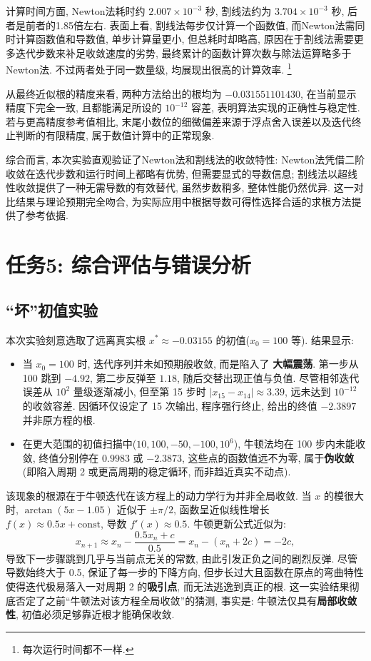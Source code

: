 \documentclass[zihao=-4,a4paper]{ctexart}
\begin{document}
计算时间方面, Newton法耗时约 $2.007\times10^{-3}$ 秒, 割线法约为 $3.704\times10^{-3}$ 秒, 后者是前者的1.85倍左右. 表面上看, 割线法每步仅计算一个函数值, 而Newton法需同时计算函数值和导数值, 单步计算量更小, 但总耗时却略高, 原因在于割线法需要更多迭代步数来补足收敛速度的劣势, 最终累计的函数计算次数与除法运算略多于Newton法. 不过两者处于同一数量级, 均展现出很高的计算效率. \footnote{每次运行时间都不一样.}

从最终近似根的精度来看, 两种方法给出的根均为 $-0.031551101430$, 在当前显示精度下完全一致, 且都能满足所设的 $10^{-12}$ 容差, 表明算法实现的正确性与稳定性. 若与更高精度参考值相比, 末尾小数位的细微偏差来源于浮点舍入误差以及迭代终止判断的有限精度, 属于数值计算中的正常现象. 

综合而言, 本次实验直观验证了Newton法和割线法的收敛特性: Newton法凭借二阶收敛在迭代步数和运行时间上都略有优势, 但需要显式的导数信息; 割线法以超线性收敛提供了一种无需导数的有效替代, 虽然步数稍多, 整体性能仍然优异. 这一对比结果与理论预期完全吻合, 为实际应用中根据导数可得性选择合适的求根方法提供了参考依据. 

\section{任务5: 综合评估与错误分析}
\subsection{“坏”初值实验}

本次实验刻意选取了远离真实根 $x^* \approx -0.03155$ 的初值($x_0=100$ 等). 结果显示:

\begin{itemize}
    \item 当 $x_0=100$ 时, 迭代序列并未如预期般收敛, 而是陷入了 \textbf{大幅震荡}. 第一步从 100 跳到 $-4.92$, 第二步反弹至 $1.18$, 随后交替出现正值与负值. 尽管相邻迭代误差从 $10^2$ 量级逐渐减小, 但至第 15 步时 $|x_{15}-x_{14}| \approx 3.39$, 远未达到 $10^{-12}$ 的收敛容差. 因循环仅设定了 15 次输出, 程序强行终止, 给出的终值 $-2.3897$ 并非原方程的根. 
    
    \item 在更大范围的初值扫描中($10, 100, -50, -100, 10^6$), 牛顿法均在 100 步内未能收敛, 终值分别停在 $0.9983$ 或 $-2.3873$, 这些点的函数值远不为零, 属于\textbf{伪收敛}(即陷入周期 2 或更高周期的稳定循环, 而非趋近真实不动点). 
\end{itemize}

该现象的根源在于牛顿迭代在该方程上的动力学行为并非全局收敛. 当 $x$ 的模很大时, $\arctan(5x-1.05)$ 近似于 $\pm\pi/2$, 函数呈近似线性增长 $f(x) \approx 0.5x + \text{const}$, 导数 $f'(x) \approx 0.5$. 牛顿更新公式近似为: 
\[
x_{n+1} \approx x_n - \frac{0.5x_n + c}{0.5} = x_n - (x_n + 2c) = -2c,
\]
导致下一步骤跳到几乎与当前点无关的常数, 由此引发正负之间的剧烈反弹. 尽管导数始终大于 0.5, 保证了每一步的下降方向, 但步长过大且函数在原点的弯曲特性使得迭代极易落入一对周期 2 的\textbf{吸引点}, 而无法逃逸到真正的根. 这一实验结果彻底否定了之前“牛顿法对该方程全局收敛”的猜测, 事实是: 牛顿法仅具有\textbf{局部收敛性}, 初值必须足够靠近根才能确保收敛. 
\end{document}
